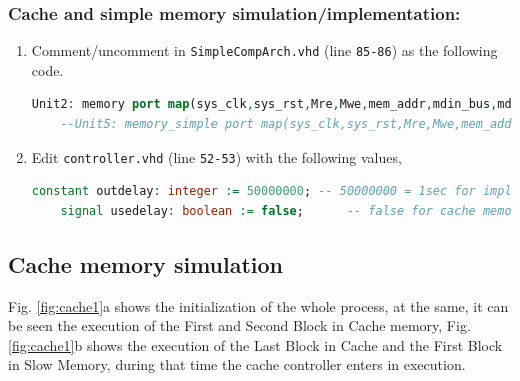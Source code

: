 \documentclass[]{article}
\begin{document}
\subsubsection*{Cache and simple memory simulation/implementation:}
\begin{enumerate}
	\item Comment/uncomment in \verb|SimpleCompArch.vhd| (line \verb|85-86|) as the following code. 
	\begin{lstlisting}[language=vhdl, caption={}, label={}]
	Unit2: memory port map(sys_clk,sys_rst,Mre,Mwe,mem_addr,mdin_bus,mdout_bus,data_ready); 
	--Unit5: memory_simple port map(sys_clk,sys_rst,Mre,Mwe,mem_addr,mdin_bus,mdout_bus,data_ready);\end{lstlisting}
	\item Edit \verb|controller.vhd| (line \verb|52-53|) with the following values,  
	\begin{lstlisting}[language=vhdl, caption={}, label={}]
	constant outdelay: integer := 50000000; -- 50000000 = 1sec for implementation, 14 for simulation
	signal usedelay: boolean := false; 		-- false for cache memory, true for memory_slow \end{lstlisting}
\end{enumerate} 

\subsection{Cache memory simulation}
Fig. \ref{fig:cache1}a shows the initialization of the whole process, at the same, it can be seen the execution of the First and Second Block in Cache memory, Fig. \ref{fig:cache1}b shows the execution of the Last Block in Cache and the First Block in Slow Memory, during that time the cache controller enters in execution.  
\end{document}
